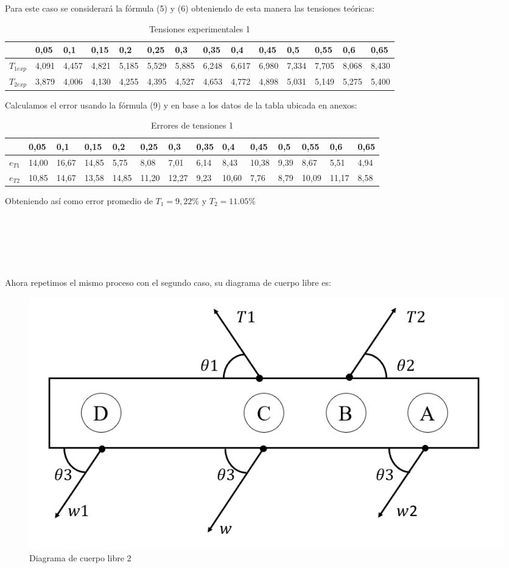 \documentclass[a4paper]{article}
\begin{document}
Para este caso se considerará la fórmula (5) y (6) obteniendo de esta manera las tensiones teóricas:

\begin{table}[H]
\centering
\begin{tabular}{l|l|l|l|l|l|l|l|l|l|l|l|l|l|}
\cline{2-14}
                         & 0,05  & 0,1   & 0,15  & 0,2   & 0,25  & 0,3   & 0,35  & 0,4   & 0,45  & 0,5   & 0,55  & 0,6   & 0,65  \\ \hline
\multicolumn{1}{|l|}{$T_{1 exp}$} & 4,091 & 4,457 & 4,821 & 5,185 & 5,529 & 5,885 & 6,248 & 6,617 & 6,980 & 7,334 & 7,705 & 8,068 & 8,430 \\ \hline
\multicolumn{1}{|l|}{$T_{2 exp}$} & 3,879 & 4,006 & 4,130 & 4,255 & 4,395 & 4,527 & 4,653 & 4,772 & 4,898 & 5,031 & 5,149 & 5,275 & 5,400 \\ \hline
\end{tabular}
\caption{Tensiones experimentales 1}
\end{table}

Calculamos el error usando la fórmula (9) y en base a los datos de la tabla ubicada en anexos:

\begin{table}[H]
\centering
\begin{tabular}{l|l|l|l|l|l|l|l|l|l|l|l|l|l|}
\cline{2-14}
                         & 0,05  & 0,1   & 0,15  & 0,2   & 0,25  & 0,3   & 0,35 & 0,4   & 0,45  & 0,5  & 0,55  & 0,6   & 0,65 \\ \hline
\multicolumn{1}{|l|}{$e_{T1}$} & 14,00 & 16,67 & 14,85 & 5,75  & 8,08  & 7,01  & 6,14 & 8,43  & 10,38 & 9,39 & 8,67  & 5,51  & 4,94 \\ \hline
\multicolumn{1}{|l|}{$e_{T2}$} & 10,85 & 14,67 & 13,58 & 14,85 & 11,20 & 12,27 & 9,23 & 10,60 & 7,76  & 8,79 & 10,09 & 11,17 & 8,58 \\ \hline
\end{tabular}
\caption{Errores de tensiones 1}
\end{table}

Obteniendo así como error promedio de $T_1=9,22\%$ y $T_2=11.05\%$

\

\

\


Ahora repetimos el mismo proceso con el segundo caso, su diagrama de cuerpo libre es:
\begin{figure} [H]
    \centering
    \includegraphics[width=0.6 \textwidth]{Diagrama de cuerpo libre 2.png}
    \caption{Diagrama de cuerpo libre 2}
    \end{figure}
\end{document}
